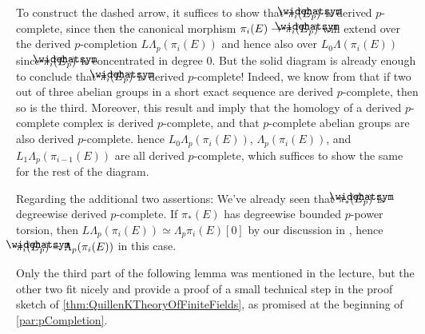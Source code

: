 \begin{proof*}
	To construct the dashed arrow, it suffices to show that $\pi_i(\roof{E}_p)$ is derived $p$-complete, since then the canonical morphism $\pi_i(E)\morphism \pi_i(\roof{E}_p)$ will extend over the derived $p$-completion $L\Lambda_p(\pi_i(E))$ and hence also over $L_0\Lambda(\pi_i(E))$ since $\pi_i(\roof{E}_p)$ is concentrated in degree $0$. But the solid diagram is already enough to conclude that $\pi_i(\roof{E}_p)$ is derived $p$-complete! Indeed, we know from \cite[]{stacks-project} that if two out of three abelian groups in a short exact sequence are derived $p$-complete, then so is the third. Moreover, this result and \cite[]{stacks-project} imply that the homology of a derived $p$-complete complex is derived $p$-complete, and that $p$-complete abelian groups are also derived $p$-complete. hence $L_0\Lambda_p(\pi_i(E))$, $\Lambda_p(\pi_i(E))$, and $L_1\Lambda_p(\pi_{i-1}(E))$ are all derived $p$-complete, which suffices to show the same for the rest of the diagram.
	
	Regarding the additional two assertions: We've already seen that $\pi_*(\roof{E}_p)$ is degreewise derived $p$-complete. If $\pi_*(E)$ has degreewise bounded $p$-power torsion, then $L\Lambda_p(\pi_i(E))\simeq \Lambda_p\pi_i(E)[0]$ by our discussion in , hence $\pi_i(\roof{E}_p)=\Lambda_p(\pi_i(E))$ in this case.
\end{proof*}
Only the third part of the following lemma was mentioned in the lecture, but the other two fit nicely and provide a proof of a small technical step in the proof sketch of \cref{thm:QuillenKTheoryOfFiniteFields}, as promised at the beginning of \cref{par:pCompletion}. 
